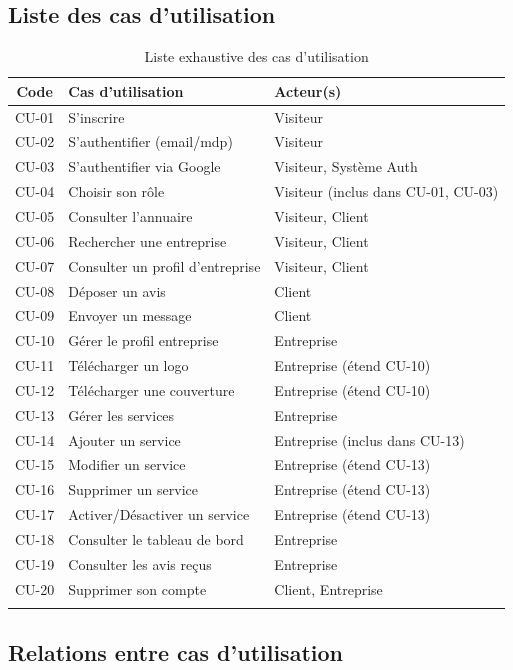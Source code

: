 \documentclass[12pt,a4paper]{article}
\begin{document}
\subsection{Liste des cas d'utilisation}

\begin{longtable}{cp{5cm}p{6cm}}
\toprule
\textbf{Code} & \textbf{Cas d'utilisation} & \textbf{Acteur(s)} \\
\midrule
\endhead
CU-01 & S'inscrire & Visiteur \\
CU-02 & S'authentifier (email/mdp) & Visiteur \\
CU-03 & S'authentifier via Google & Visiteur, Système Auth \\
CU-04 & Choisir son rôle & Visiteur (inclus dans CU-01, CU-03) \\
CU-05 & Consulter l'annuaire & Visiteur, Client \\
CU-06 & Rechercher une entreprise & Visiteur, Client \\
CU-07 & Consulter un profil d'entreprise & Visiteur, Client \\
CU-08 & Déposer un avis & Client \\
CU-09 & Envoyer un message & Client \\
CU-10 & Gérer le profil entreprise & Entreprise \\
CU-11 & Télécharger un logo & Entreprise (étend CU-10) \\
CU-12 & Télécharger une couverture & Entreprise (étend CU-10) \\
CU-13 & Gérer les services & Entreprise \\
CU-14 & Ajouter un service & Entreprise (inclus dans CU-13) \\
CU-15 & Modifier un service & Entreprise (étend CU-13) \\
CU-16 & Supprimer un service & Entreprise (étend CU-13) \\
CU-17 & Activer/Désactiver un service & Entreprise (étend CU-13) \\
CU-18 & Consulter le tableau de bord & Entreprise \\
CU-19 & Consulter les avis reçus & Entreprise \\
CU-20 & Supprimer son compte & Client, Entreprise \\
\bottomrule
\caption{Liste exhaustive des cas d'utilisation}
\end{longtable}

\subsection{Relations entre cas d'utilisation}
\end{document}
